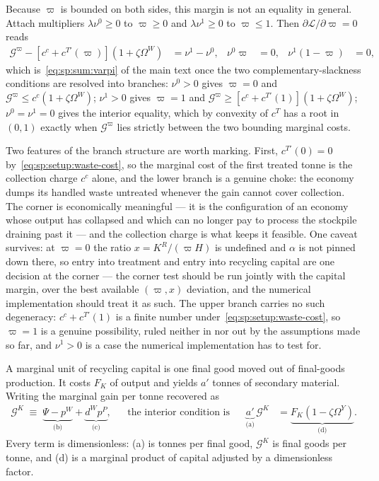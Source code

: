  Because $\varpi$ is bounded on both sides, this margin is
not an equality in general. Attach multipliers $\lambda\nu^0\ge0$ to $\varpi\ge0$ and
$\lambda\nu^1\ge0$ to $\varpi\le1$. Then $\partial\mathcal L/\partial\varpi=0$ reads
\begin{align}
\mathcal G^\varpi-\left[c^c+c^{T\prime}\left(\varpi\right)\right]\left(1+\zeta\Omega^W\right)
&= \nu^1-\nu^0,
&
\nu^0\varpi &= 0,
&
\nu^1\left(1-\varpi\right) &= 0,
\label{eq:sp:foc:varpi-kkt}
\end{align}
which is~\eqref{eq:sp:sum:varpi} of the main text once the two complementary-slackness conditions are
resolved into branches: $\nu^0>0$ gives $\varpi=0$ and
$\mathcal G^\varpi\le c^c\left(1+\zeta\Omega^W\right)$; $\nu^1>0$ gives
$\varpi=1$ and $\mathcal G^\varpi\ge \left[c^c+c^{T\prime}\left(1\right)\right]\left(1+\zeta\Omega^W\right)$;
$\nu^0=\nu^1=0$ gives the interior equality, which by convexity of $c^T$ has a root in
$\left(0,1\right)$ exactly when $\mathcal G^\varpi$ lies strictly between the two bounding marginal
costs.

Two features of the branch structure are worth marking. First,
$c^{T\prime}\left(0\right)=0$ by~\eqref{eq:sp:setup:waste-cost}, so the marginal cost of the first
treated tonne is the collection charge $c^c$ alone, and the lower branch is a genuine choke: the
economy dumps its handled waste untreated whenever the gain cannot cover collection. The corner is
economically meaningful --- it is the configuration of an economy whose output has collapsed and
which can no longer pay to process the stockpile draining past it --- and the collection charge is
what keeps it feasible. One caveat survives: at $\varpi=0$ the ratio $x=K^R/\left(\varpi H\right)$ is
undefined and $\alpha$ is not pinned down there, so entry into treatment and entry into recycling
capital are one decision at the corner --- the corner test should be run jointly with the capital
margin, over the best available $\left(\varpi,x\right)$ deviation, and the numerical implementation
should treat it as such.
The upper branch carries no such degeneracy: $c^c+c^{T\prime}\left(1\right)$ is a finite number
under~\eqref{eq:sp:setup:waste-cost}, so $\varpi=1$ is a genuine possibility, ruled neither in nor out
by the assumptions made so far, and $\nu^1>0$ is a case the numerical implementation has to test for.

 A marginal unit of recycling capital is one final good moved out of final-goods production. It costs $F_K$ of output and yields $a'$ tonnes of secondary material. Writing the marginal gain per tonne recovered as
\begin{align}
\mathcal G^K \;\equiv\; \underbrace{\Psi-p^W}_{\text{(b)}}+\underbrace{d^Wp^P}_{\text{(c)}},
&&\text{the interior condition is}
&&
\underbrace{a'}_{\text{(a)}}\,\mathcal G^K &= \underbrace{F_K\left(1-\zeta\Omega^Y\right)}_{\text{(d)}} .
\label{eq:sp:foc:KR}
\end{align}
Every term is dimensionless: (a) is tonnes per final good, $\mathcal G^K$ is final goods per tonne, and (d) is a marginal product of capital adjusted by a dimensionless factor.

